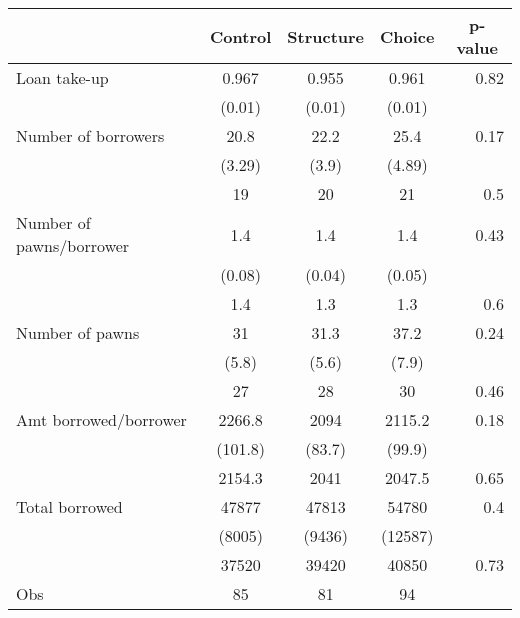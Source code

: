\begin{tabular}{lcccr}
\toprule
      & Control & Structure & Choice & \multicolumn{1}{c}{p-value} \\
\midrule
\midrule
Loan take-up & 0.967 & 0.955 & 0.961 & 0.82 \\
      & (0.01) & (0.01) & (0.01) &  \\
\midrule
Number of borrowers & 20.8  & 22.2  & 25.4  & 0.17 \\
      & (3.29) & (3.9) & (4.89) &  \\
\rowcolor[rgb]{ .949,  .949,  .949} \multicolumn{1}{r}{median} & 19    & 20    & 21    & 0.5 \\
\midrule
Number of pawns/borrower & 1.4   & 1.4   & 1.4   & 0.43 \\
      & (0.08) & (0.04) & (0.05) &  \\
\rowcolor[rgb]{ .949,  .949,  .949} \multicolumn{1}{r}{median} & 1.4   & 1.3   & 1.3   & 0.6 \\
\midrule
Number of pawns  & 31    & 31.3  & 37.2  & 0.24 \\
      & (5.8) & (5.6) & (7.9) &  \\
\rowcolor[rgb]{ .949,  .949,  .949} \multicolumn{1}{r}{median} & 27    & 28    & 30    & 0.46 \\
\midrule
Amt borrowed/borrower & 2266.8 & 2094  & 2115.2 & 0.18 \\
      & (101.8) & (83.7) & (99.9) &  \\
\rowcolor[rgb]{ .949,  .949,  .949} \multicolumn{1}{r}{median} & 2154.3 & 2041  & 2047.5 & 0.65 \\
\midrule
Total borrowed & 47877 & 47813 & 54780 & 0.4 \\
      & (8005) & (9436) & (12587) &  \\
\rowcolor[rgb]{ .949,  .949,  .949} \multicolumn{1}{r}{median} & 37520 & 39420 & 40850 & 0.73 \\
\midrule
Obs   & 85    & 81    & 94    &  \\
\bottomrule
\bottomrule
\end{tabular}%
